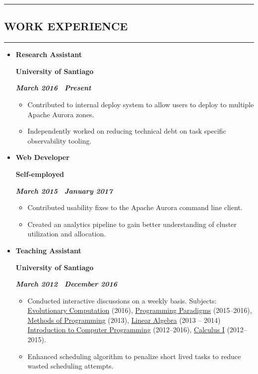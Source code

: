\documentclass[10pt,letterpaper]{article}
\newcommand{\textbox}[1]{
  \parbox{.333\textwidth}{#1}
}
\newcommand{\sectionTitle}[1]{
  \hrule
  \vspace{-1.0em} 
  \subsection*{\uppercase{\textbf{#1}}}
  \vspace{-0.3em}
    \hrule
}
\newcommand{\titleExperienceWithoutLocation}[4]{
  \vspace{1.0em}
  
  \item[]
  {
    \textbox{\textbf{#1}\hfill}\textbox{\hfil \textbf{#2}\hfil}\hfill \textbf{\emph{#3 \textendash \ #4}}
  }
}
\begin{document}
  \sectionTitle{Work Experience}
  \begin{itemize}[leftmargin=*]
    \parskip=-0.6em
    \titleExperienceWithoutLocation{Research Assistant}{University of Santiago}{March 2016}{Present}
      \begin{itemize}[label=\textbullet]
        \itemsep0em
        \item Contributed to internal deploy system to allow users to deploy to multiple Apache Aurora zones.
        \item Independently worked on reducing technical debt on task specific observability tooling.
      \end{itemize}

    \titleExperienceWithoutLocation{Web Developer}{Self-employed}{March 2015}{January 2017}
      \begin{itemize}[label=\textbullet]
        \itemsep0em
        \item Contributed usability fixes to the Apache Aurora command line client.
        \item Created an analytics pipeline to gain better understanding of cluster utilization and allocation.
      \end{itemize}
    
    \titleExperienceWithoutLocation{Teaching Assistant}{University of Santiago}{March 2012}{December 2016}
      \begin{itemize}[label=\textbullet]
        \itemsep0em
        \item Conducted interactive discussions on a weekly basis. Subjects: \underline{Evolutionary Computation} (2016), \underline{Programming Paradigms} (2015–2016), \underline{Methods of Programming} (2013), \underline{Linear Algebra} (2013 – 2014) \underline{Introduction to Computer Programming} (2012–2016), \underline{Calculus I} (2012–2015).
        \item Enhanced scheduling algorithm to penalize short lived tasks to reduce wasted scheduling attempts.
      \end{itemize}
    
  \end{itemize}
  
\end{document}

